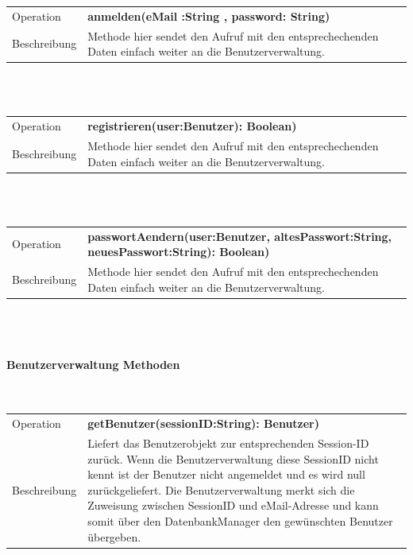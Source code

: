 \documentclass[12pt,a4paper]{article}
\begin{document}
\begin{tabular}{|lp{12cm}|}
	\hline
	Operation &  \textbf{anmelden(eMail :String , password: String) }\\ 
	Beschreibung & Methode hier sendet den Aufruf mit den entsprechechenden Daten einfach weiter an die Benutzerverwaltung. \\ 
	\hline 
	\end{tabular} \\\\
	
	
\begin{tabular}{|lp{12cm}|}
	\hline
	Operation &  \textbf{registrieren(user:Benutzer): Boolean) }\\ 
	Beschreibung & Methode hier sendet den Aufruf mit den entsprechechenden Daten einfach weiter an die Benutzerverwaltung. \\ 
	\hline 
	\end{tabular} \\\\

\begin{tabular}{|lp{12cm}|}
	\hline
	Operation &  \textbf{passwortAendern(user:Benutzer, altesPasswort:String, neuesPasswort:String): Boolean) }\\ 
	Beschreibung & Methode hier sendet den Aufruf mit den entsprechechenden Daten einfach weiter an die Benutzerverwaltung. \\ 
	\hline 
\end{tabular} \\\\


\paragraph{Benutzerverwaltung  Methoden}\mbox{}\\


\begin{tabular}{|lp{12cm}|}
	\hline
	Operation &  \textbf{getBenutzer(sessionID:String): Benutzer) }\\ 
	Beschreibung & Liefert das Benutzerobjekt zur entsprechenden Session-ID zurück. Wenn die Benutzerverwaltung diese SessionID nicht kennt ist der Benutzer nicht angemeldet und es wird null zurückgeliefert. Die Benutzerverwaltung merkt sich die Zuweisung zwischen SessionID und eMail-Adresse und kann somit über den DatenbankManager den gewünschten Benutzer übergeben. \\ 
	\hline 
\end{tabular} \\\\
\end{document}
